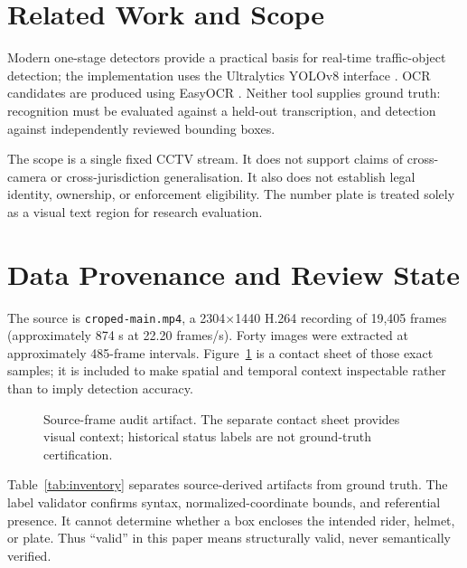 \documentclass[journal]{IEEEtran}
\begin{document}
\section{Related Work and Scope}
Modern one-stage detectors provide a practical basis for real-time traffic-object detection; the implementation uses the Ultralytics YOLOv8 interface \cite{yolov8}. OCR candidates are produced using EasyOCR \cite{easyocr}. Neither tool supplies ground truth: recognition must be evaluated against a held-out transcription, and detection against independently reviewed bounding boxes.

The scope is a single fixed CCTV stream. It does not support claims of cross-camera or cross-jurisdiction generalisation. It also does not establish legal identity, ownership, or enforcement eligibility. The number plate is treated solely as a visual text region for research evaluation.

\section{Data Provenance and Review State}
The source is \texttt{croped-main.mp4}, a 2304$\times$1440 H.264 recording of 19,405 frames (approximately 874 s at 22.20 frames/s). Forty images were extracted at approximately 485-frame intervals. Figure~\ref{fig:contact} is a contact sheet of those exact samples; it is included to make spatial and temporal context inspectable rather than to imply detection accuracy.

\begin{figure}[!t]\centering{}\caption{Source-frame audit artifact. The separate contact sheet provides visual context; historical status labels are not ground-truth certification.}\label{fig:contact}\end{figure}

Table~\ref{tab:inventory} separates source-derived artifacts from ground truth. The label validator confirms syntax, normalized-coordinate bounds, and referential presence. It cannot determine whether a box encloses the intended rider, helmet, or plate. Thus ``valid'' in this paper means structurally valid, never semantically verified.
\end{document}
